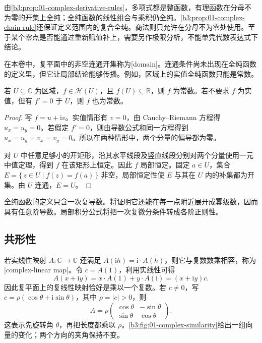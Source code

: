 \ProseParagraphBreak

由\cref{b3:prop:01-complex-derivative-rules}，多项式都是整函数，有理函数在分母不为零的开集上全纯；全纯函数的线性组合与乘积仍全纯。\cref{b3:prop:01-complex-chain-rule}还保证定义范围内的复合全纯。商法则只允许在分母不为零处使用。至于某个零点是否能通过重新赋值补上，需要另作极限分析，不能单凭代数表达式下结论。

\ProseParagraphBreak

在本卷中，复平面中的非空连通开集称为[domain]。连通条件尚未出现在全纯函数的定义里，但它让局部结论能够传播。例如，区域上的实值全纯函数只能是常数。

\begin{proposition}\label{b3:prop:01-real-valued-holomorphic}
若 \(U\subseteq\mathbb C\) 为区域，\(f\in\mathcal H(U)\)，且 \(f(U)\subseteq\mathbb R\)，则 \(f\) 为常数。若不要求 \(f\) 为实值，但有 \(f'=0\) 于 \(U\)，则 \(f\) 也为常数。
\end{proposition}
\begin{proof}
写 \(f=u+\mathrm{i}v\)。实值情形有 \(v=0\)，由 Cauchy--Riemann 方程得 \(u_x=u_y=0\)。若假定 \(f'=0\)，则由导数公式和同一方程得到 \(u_x=u_y=v_x=v_y=0\)。所以在两种情形中，两个分量的偏导都为零。

对 \(U\) 中任意足够小的开矩形，沿其水平线段及竖直线段分别对两个分量使用一元中值定理，得到 \(f\) 在该矩形上恒定。因此 \(f\) 局部恒定。固定 \(a\in U\)，集合 \(E=\{\,z\in U\mid f(z)=f(a)\,\}\) 非空，局部恒定性使 \(E\) 与其在 \(U\) 内的补集都为开集。由 \(U\) 连通，\(E=U\)。
\end{proof}

全纯函数的定义只含一次复导数。将证明它还能在每一点附近展开成幂级数，因而具有任意阶导数。局部积分公式将把一次复微分条件转成各阶正则性。

\subsection{共形性}
\label{b3:subsec:010104}

若实线性映射 \(A:\mathbb C\rightarrow\mathbb C\) 还满足 \(A(\mathrm{i}h)=\mathrm{i}\cdot A(h)\)，则它与复数数乘相容，称为[complex-linear map]。令 \(c=A(1)\)，利用实线性可得
\[
 A(x+\mathrm{i}y)=x\cdot A(1)+y\cdot A(\mathrm{i})=(x+\mathrm{i}y)c.
\]
因此复平面上的复线性映射恰好是乘以一个复数。若 \(c\ne0\)，写 \(c=\rho(\cos\theta+\mathrm{i}\sin\theta)\)，其中 \(\rho=\lvert c\rvert>0\)，则
\[
 A=\rho
 \begin{pmatrix}
 \cos\theta&-\sin\theta\\
 \sin\theta&\cos\theta
 \end{pmatrix}.
\]
这表示先旋转角 \(\theta\)，再把长度都乘以 \(\rho\)。\cref{b3:fig:01-complex-similarity}给出一组向量的变化；两个方向的夹角保持不变。

